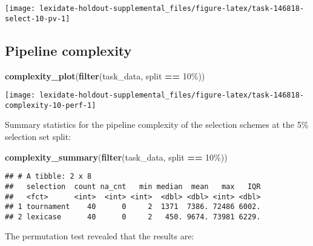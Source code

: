 \documentclass[
]{book}
\newenvironment{Shaded}{\begin{snugshade}}{\end{snugshade}}
\newcommand{\FunctionTok}[1]{\textcolor[rgb]{0.13,0.29,0.53}{\textbf{#1}}}
\newcommand{\NormalTok}[1]{#1}
\newcommand{\SpecialCharTok}[1]{\textcolor[rgb]{0.81,0.36,0.00}{\textbf{#1}}}
\newcommand{\StringTok}[1]{\textcolor[rgb]{0.31,0.60,0.02}{#1}}
\begin{document}
\texttt{[image: lexidate-holdout-supplemental\_files/figure-latex/task-146818-select-10-pv-1]}

\hypertarget{pipeline-complexity-1}{%
\subsection{Pipeline complexity}\label{pipeline-complexity-1}}

\begin{Shaded}
\begin{Highlighting}[]
\FunctionTok{complexity\_plot}\NormalTok{(}\FunctionTok{filter}\NormalTok{(task\_data, split }\SpecialCharTok{==} \StringTok{\textquotesingle{}10\%\textquotesingle{}}\NormalTok{))}
\end{Highlighting}
\end{Shaded}

\texttt{[image: lexidate-holdout-supplemental\_files/figure-latex/task-146818-complexity-10-perf-1]}

Summary statistics for the pipeline complexity of the selection schemes at the 5\% selection set split:

\begin{Shaded}
\begin{Highlighting}[]
\FunctionTok{complexity\_summary}\NormalTok{(}\FunctionTok{filter}\NormalTok{(task\_data, split }\SpecialCharTok{==} \StringTok{\textquotesingle{}10\%\textquotesingle{}}\NormalTok{))}
\end{Highlighting}
\end{Shaded}

\begin{verbatim}
## # A tibble: 2 x 8
##   selection  count na_cnt   min median  mean   max   IQR
##   <fct>      <int>  <int> <int>  <dbl> <dbl> <int> <dbl>
## 1 tournament    40      0     2  1371  7386. 72486 6002.
## 2 lexicase      40      0     2   450. 9674. 73981 6229.
\end{verbatim}

The permutation test revealed that the results are:
\end{document}

